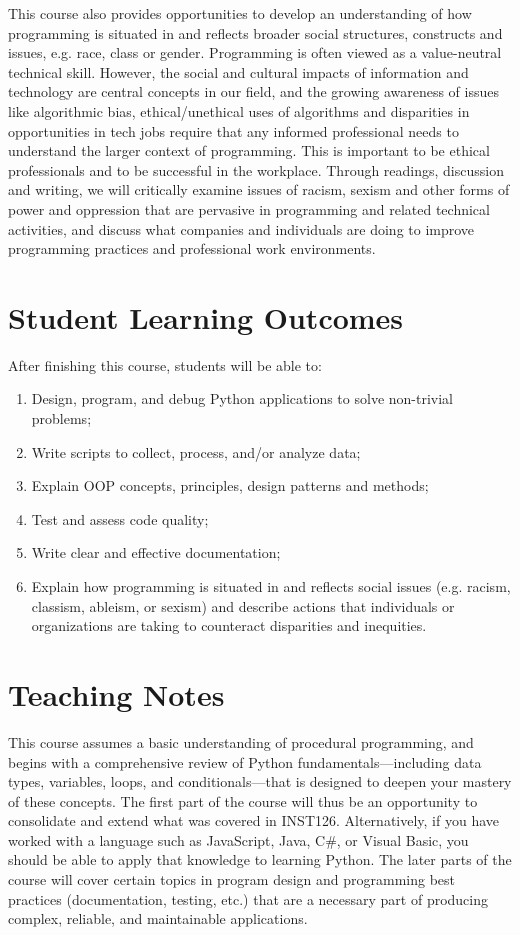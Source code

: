 \documentclass[11pt]{article}
\begin{document}
This course also provides opportunities to develop an understanding of how programming is situated in and reflects broader social structures, constructs and issues, e.g. race, class or gender. Programming is often viewed as a value-neutral technical skill. However, the social and cultural impacts of information and technology are central concepts in our field, and the growing awareness of issues like algorithmic bias, ethical/unethical uses of algorithms and disparities in opportunities in tech jobs require that  any informed professional needs to understand the larger context of programming. This is important to be ethical professionals and to be successful in the workplace. Through readings, discussion and writing, we will critically examine issues of racism, sexism and other forms of power and oppression that are pervasive in programming and related technical activities, and discuss what companies and individuals are doing to improve programming practices and professional work environments.

\section{Student Learning Outcomes}
After finishing this course, students will be able to:
\begin{enumerate}
	\item Design, program, and debug Python applications to solve non-trivial problems;
	\item Write scripts to collect, process, and/or analyze data;
	\item Explain OOP concepts, principles, design patterns and methods;
	\item Test and assess code quality;
	\item Write clear and effective documentation;
	\item Explain how programming is situated in and reflects social issues (e.g. racism, classism, ableism, or sexism) and describe actions that individuals or organizations are taking to counteract disparities and inequities.
\end{enumerate}

\section{Teaching Notes}
This course assumes a basic understanding of procedural programming, and begins with a comprehensive review of Python fundamentals---including data types, variables, loops, and conditionals---that is designed to deepen your mastery of these concepts. The first part of the course will thus be an opportunity to consolidate and extend what was covered in INST126. Alternatively, if you have worked with a language such as JavaScript, Java, C\#, or Visual Basic, you should be able to apply that knowledge to learning Python. The later parts of the course will cover certain topics in program design and programming best practices (documentation, testing, etc.) that are a necessary part of producing complex, reliable, and maintainable applications. 
\end{document}
